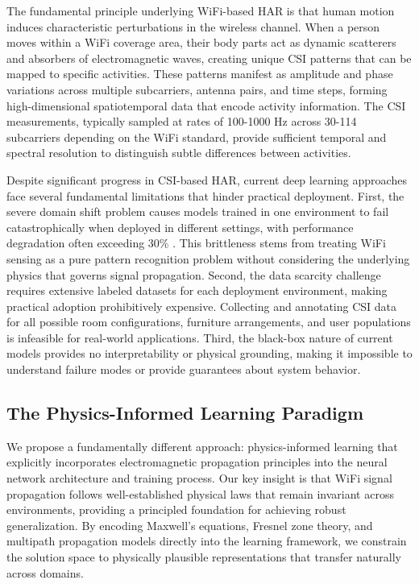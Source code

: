 \documentclass[10pt,journal,compsoc]{IEEEtran}
\begin{document}
The fundamental principle underlying WiFi-based HAR is that human motion induces characteristic perturbations in the wireless channel. When a person moves within a WiFi coverage area, their body parts act as dynamic scatterers and absorbers of electromagnetic waves, creating unique CSI patterns that can be mapped to specific activities. These patterns manifest as amplitude and phase variations across multiple subcarriers, antenna pairs, and time steps, forming high-dimensional spatiotemporal data that encode activity information. The CSI measurements, typically sampled at rates of 100-1000 Hz across 30-114 subcarriers depending on the WiFi standard, provide sufficient temporal and spectral resolution to distinguish subtle differences between activities.

Despite significant progress in CSI-based HAR, current deep learning approaches face several fundamental limitations that hinder practical deployment. First, the severe domain shift problem causes models trained in one environment to fail catastrophically when deployed in different settings, with performance degradation often exceeding 30\% \cite{fewsense2022, airfi2022}. This brittleness stems from treating WiFi sensing as a pure pattern recognition problem without considering the underlying physics that governs signal propagation. Second, the data scarcity challenge requires extensive labeled datasets for each deployment environment, making practical adoption prohibitively expensive. Collecting and annotating CSI data for all possible room configurations, furniture arrangements, and user populations is infeasible for real-world applications. Third, the black-box nature of current models provides no interpretability or physical grounding, making it impossible to understand failure modes or provide guarantees about system behavior.

\subsection{The Physics-Informed Learning Paradigm}

We propose a fundamentally different approach: physics-informed learning that explicitly incorporates electromagnetic propagation principles into the neural network architecture and training process. Our key insight is that WiFi signal propagation follows well-established physical laws that remain invariant across environments, providing a principled foundation for achieving robust generalization. By encoding Maxwell's equations, Fresnel zone theory, and multipath propagation models directly into the learning framework, we constrain the solution space to physically plausible representations that transfer naturally across domains.
\end{document}
